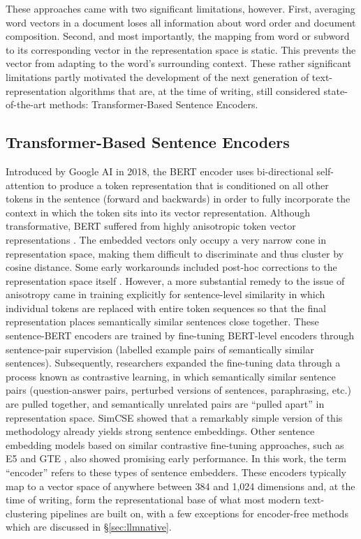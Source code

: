 \documentclass[11pt,a4paper,oneside]{report}
\begin{document}
These approaches came with two significant limitations, however. First, averaging word vectors in a document loses all information about word order and document composition. Second, and most importantly, the mapping from word or subword to its corresponding vector in the representation space is static. This prevents the vector from adapting to the word's surrounding context. These rather significant limitations partly motivated the development of the next generation of text-representation algorithms that are, at the time of writing, still considered state-of-the-art methods: Transformer-Based Sentence Encoders.

\subsection{Transformer-Based Sentence Encoders}\label{sec:transenc}

Introduced by Google AI in 2018, the BERT  encoder \citep{devlin2019bert} uses bi-directional self-attention to produce a token representation that is conditioned on all other tokens in the sentence (forward and backwards) in order to fully incorporate the context in which the token sits into its vector representation. Although transformative, BERT suffered from highly anisotropic token vector representations \citep{ethayarajh2019contextual}. The embedded vectors only occupy a very narrow cone in representation space, making them difficult to discriminate and thus cluster by cosine distance. Some early workarounds included post-hoc corrections to the representation space itself \citep{li2020sentence,su2021whitening}. However, a more substantial remedy to the issue of anisotropy came in training explicitly for sentence-level similarity in which individual tokens are replaced with entire token sequences so that the final representation places semantically similar sentences close together. These sentence-BERT \citep{reimers2019sbert} encoders are trained by fine-tuning BERT-level encoders through sentence-pair supervision (labelled example pairs of semantically similar sentences). Subsequently, researchers expanded the fine-tuning data through a process known as contrastive learning, in which semantically similar sentence pairs (question-answer pairs, perturbed versions of sentences, paraphrasing, etc.) are pulled together, and semantically unrelated pairs are ``pulled apart'' in representation space. SimCSE  \citep{gao2021simcse} showed that a remarkably simple version of this methodology already yields strong sentence embeddings. Other sentence embedding models based on similar contrastive fine-tuning approaches, such as E5 \citep{wang2022e5} and GTE \citep{li2023gte}, also showed promising early performance. In this work, the term ``encoder'' refers to these types of sentence embedders. These encoders typically map to a vector space of anywhere between 384 and 1{,}024 dimensions and, at the time of writing, form the representational base of what most modern text-clustering pipelines are built on, with a few exceptions for encoder-free methods which are discussed in \S\ref{sec:llmnative}.
\end{document}

